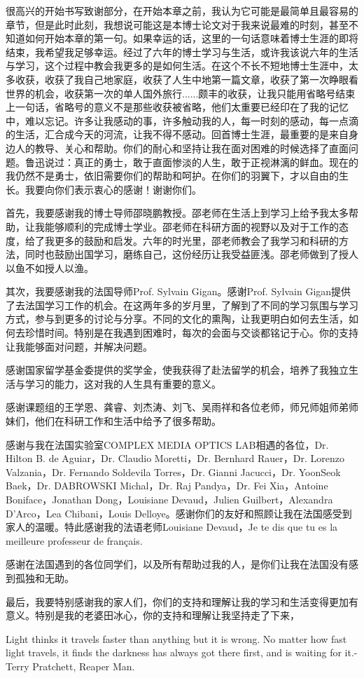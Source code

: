 
\begin{thanks}

很高兴的开始书写致谢部分，在开始本章之前，我认为它可能是最简单且最容易的章节，但是此时此刻，我想说可能这是本博士论文对于我来说最难的时刻，甚至不知道如何开始本章的第一句。如果幸运的话，这里的一句话意味着博士生涯的即将结束，我希望我足够幸运。经过了六年的博士学习与生活，或许我该说六年的生活与学习，这个过程中教会我更多的是如何生活。在这个不长不短地博士生涯中，太多收获，收获了我自己地家庭，收获了人生中地第一篇文章，收获了第一次睁眼看世界的机会，收获第一次的单人国外旅行......颇丰的收获，让我只能用省略号结束上一句话，省略号的意义不是那些收获被省略，他们太重要已经印在了我的记忆中，难以忘记。许多让我感动的事，许多触动我的人，每一时刻的感动，每一点滴的生活，汇合成今天的河流，让我不得不感动。回首博士生涯，最重要的是来自身边人的教导、关心和帮助。你们的耐心和坚持让我在面对困难的时候选择了直面问题。鲁迅说过：真正的勇士，敢于直面惨淡的人生，敢于正视淋漓的鲜血。现在的我仍然不是勇士，依旧需要你们的帮助和呵护。在你们的羽翼下，才以自由的生长。我要向你们表示衷心的感谢！谢谢你们。

首先，我要感谢我的博士导师邵晓鹏教授。邵老师在生活上到学习上给予我太多帮助，让我能够顺利的完成博士学业。邵老师在科研方面的视野以及对于工作的态度，给了我更多的鼓励和启发。六年的时光里，邵老师教会了我学习和科研的方法，同时也鼓励出国学习，磨练自己，这份经历让我受益匪浅。邵老师做到了授人以鱼不如授人以渔。

其次，我要感谢我的法国导师Prof. Sylvain Gigan。感谢Prof. Sylvain Gigan提供了去法国学习工作的机会。在这两年多的岁月里，了解到了不同的学习氛围与学习方式，参与到更多的讨论与分享。不同的文化的熏陶，让我更明白如何去生活，如何去珍惜时间。特别是在我遇到困难时，每次的会面与交谈都铭记于心。你的支持让我能够面对问题，并解决问题。

感谢国家留学基金委提供的奖学金，使我获得了赴法留学的机会，培养了我独立生活与学习的能力，这对我的人生具有重要的意义。

感谢课题组的王学恩、龚睿、刘杰涛、刘飞、吴雨祥和各位老师，师兄师姐师弟师妹们，他们在科研工作和生活中给予了很多帮助。

感谢与我在法国实验室COMPLEX MEDIA OPTICS LAB相遇的各位，Dr. Hilton B. de Aguiar，Dr. Claudio Moretti，Dr. Bernhard Rauer，Dr. Lorenzo Valzania，Dr. Fernando Soldevila Torres，Dr. Gianni Jacucci，Dr. YoonSeok Baek，Dr. DABROWSKI Michal，Dr. Raj Pandya，Dr. Fei Xia，Antoine Boniface，Jonathan Dong，Louisiane Devaud，Julien Guilbert，Alexandra D’Arco，Lea Chibani，Louis Delloye。感谢你们的友好和照顾让我在法国感受到家人的温暖。特此感谢我的法语老师Louisiane Devaud，Je te dis que tu es la meilleure professeur de français.

感谢在法国遇到的各位同学们，以及所有帮助过我的人，是你们让我在法国没有感到孤独和无助。

最后，我要特别感谢我的家人们，你们的支持和理解让我的学习和生活变得更加有意义。特别是我的老婆田冰心，你的支持和理解让我坚持走了下来，

Light thinks it travels faster than anything but it is wrong. No matter how fast light travels, it finds the darkness has always got there first, and is waiting for it.-Terry Pratchett, Reaper Man.
\end{thanks}
